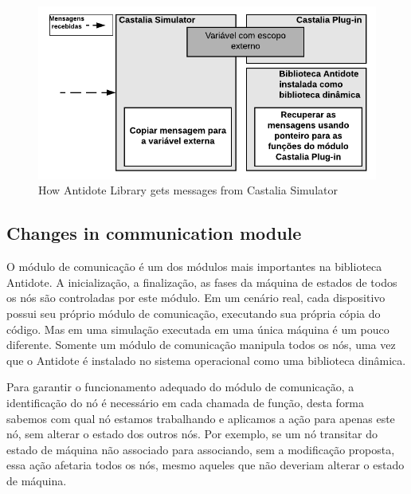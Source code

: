 
\begin{figure}[ht]
\centering
\includegraphics[width=.5\textwidth]{figures/castaliaPlugin.png}
\caption{How Antidote Library gets messages from Castalia Simulator}
\label{fig:CastaliaPlugin} 
\end{figure}

\subsection{Changes in communication module}

O módulo de comunicação é um dos módulos mais importantes na biblioteca Antidote. A inicialização, a finalização, as fases da máquina de estados de todos os nós são controladas por este módulo. Em um cenário real, cada dispositivo possui seu próprio módulo de comunicação, executando sua própria cópia do código. Mas em uma simulação executada em uma única máquina é um pouco diferente. Somente um módulo de comunicação manipula todos os nós, uma vez que o Antidote é instalado no sistema operacional como uma biblioteca dinâmica.

Para garantir o funcionamento adequado do módulo de comunicação, a identificação do nó é necessário em cada chamada de função, desta forma sabemos com qual nó estamos trabalhando e aplicamos a ação para apenas este nó, sem alterar o estado dos outros nós. Por exemplo, se um nó transitar do estado de máquina não associado para associando, sem a modificação proposta, essa ação afetaria todos os nós, mesmo aqueles que não deveriam alterar o estado de máquina. 

